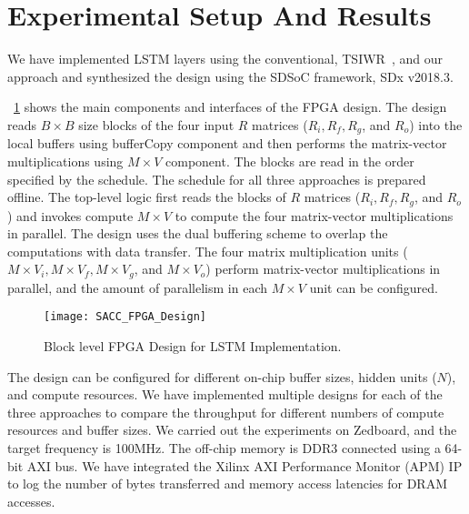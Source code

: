 \section{Experimental Setup And Results}
We have implemented LSTM layers using the conventional, TSIWR~\cite{park2020time}, and our approach and synthesized the design using the SDSoC framework, SDx v2018.3. 
\figurename{~\ref{fig:lstmFpgaDesign} shows the main components and interfaces of the FPGA design. The design reads $B{\times}B$ size blocks of the four input $R$ matrices ($R_i, R_f, R_g$, and $R_o$) into the local buffers using bufferCopy component and then performs the matrix-vector multiplications using $M{\times}V$ component. The blocks are read in the order specified by the schedule. The schedule for all three approaches is prepared offline. The top-level logic first reads the blocks of $R$ matrices ($R_i, R_f, R_g$, and $R_o$) and invokes compute $M{\times}V$ to compute the four matrix-vector multiplications in parallel. The design uses the dual buffering scheme to overlap the computations with data transfer. The four matrix multiplication units ($M{\times}V_i, M{\times}V_f, M{\times}V_g$, and $M{\times}V_o$) perform matrix-vector multiplications in parallel, and the amount of parallelism in each $M{\times}V$ unit can be configured. 
\begin{figure}[!htb]
	\centering
	\texttt{[image: SACC\_FPGA\_Design]}
	\caption{Block level FPGA Design for LSTM Implementation.}
	\label{fig:lstmFpgaDesign}
\end{figure}

The design can be configured for different on-chip buffer sizes, hidden units ($N$), and compute resources. We have implemented multiple designs for each of the three approaches to compare the throughput for different numbers of compute resources and buffer sizes. We carried out the experiments on Zedboard, and the target frequency is 100MHz. The off-chip memory is DDR3 connected using a 64-bit AXI bus. We have integrated the Xilinx AXI Performance Monitor (APM) IP to log the number of bytes transferred and memory access latencies for DRAM accesses.

}
